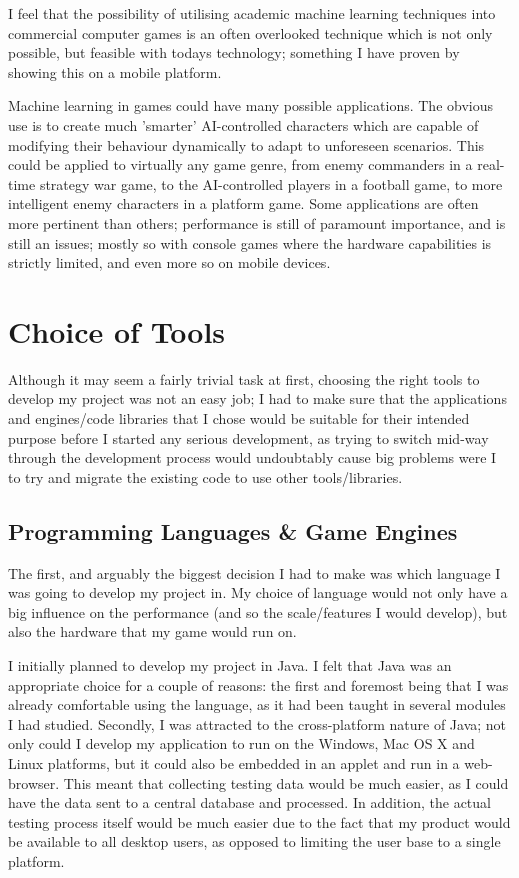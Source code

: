 \documentclass[a4paper,oneside]{report}
\begin{document}
I feel that the possibility of utilising academic machine learning techniques into commercial computer games is an often overlooked technique which is not only possible, but feasible with todays technology; something I have proven by showing this on a mobile platform. 

Machine learning in games could have many possible applications. The obvious use is to create much 'smarter' AI-controlled characters which are capable of modifying their behaviour dynamically to adapt to unforeseen scenarios. This could be applied to virtually any game genre, from enemy commanders in a real-time strategy war game, to the AI-controlled players in a football game, to more intelligent enemy characters in a platform game. Some applications are often more pertinent than others; performance is still of paramount importance, and is still an issues; mostly so with console games where the hardware capabilities is strictly limited, and even more so on mobile devices.
	
\chapter{Choice of Tools}

Although it may seem a fairly trivial task at first, choosing the right tools to develop my project was not an easy job; I had to make sure that the applications and engines/code libraries that I chose would be suitable for their intended purpose before I started any serious development, as trying to switch mid-way through the development process would undoubtably cause big problems were I to try and migrate the existing code to use other tools/libraries.

\section{Programming Languages \& Game Engines}

The first, and arguably the biggest decision I had to make was which language I was going to develop my project in. My choice of language would not only have a big influence on the performance (and so the scale/features I would develop), but also the hardware that my game would run on.  

I initially planned to develop my project in Java. I felt that Java was an appropriate choice for a couple of reasons: the first and foremost being that I was already comfortable using the language, as it had been taught in several modules I had studied. Secondly, I was attracted to the cross-platform nature of Java; not only could I develop my application to run on the Windows, Mac OS X and Linux platforms, but it could also be embedded in an applet and run in a web-browser. This meant that collecting testing data would be much easier, as I could have the data sent to a central database and processed. In addition, the actual testing process itself would be much easier due to the fact that my product would be available to all desktop users, as opposed to limiting the user base to a single platform.
\end{document}
